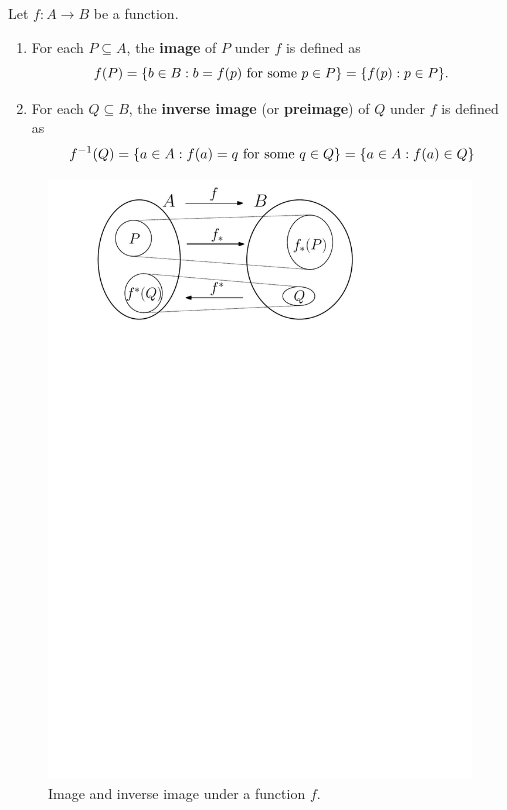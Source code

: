 \documentclass[a4paper,english,12pt]{article}
\begin{document}
\begin{defn} 
 Let $f: A \to B$ be a function.
 \begin{enumerate}
  \item For each $P\subseteq A$, the \textbf{image} of $P$ under $f$ is defined as
\begin{equation*}
f(P)  =\{b\in B: b=f(p) \textnormal{ for some } p\in P\} =\{f(p):p\in P\}.
\end{equation*}
  \item For each $Q\subseteq B$, the \textbf{inverse image} (or \textbf{preimage}) of $Q$ under $f$ is defined as
\begin{equation*}
f^{-1}(Q)  =\{a\in A: f(a)=q \textnormal{ for some } q\in Q\} =\{a\in A:f(a)\in Q\}
\end{equation*}
 \end{enumerate}
\end{defn}
\begin{figure}[hhh]
\centering
\includegraphics[scale=0.6]{Figures/l5f1_img-invimg.pdf}
\caption{Image and inverse image under a function $f$.}
\end{figure}
\end{document}
